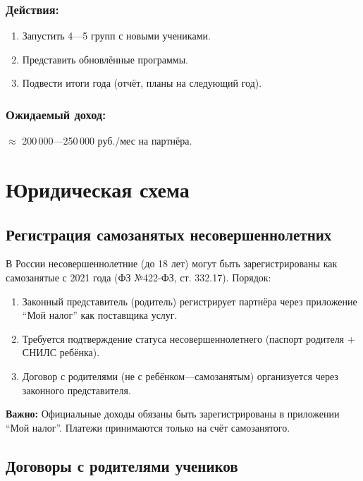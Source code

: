 \documentclass[12pt,a4paper]{article}
\begin{document}
\subsubsection*{Действия:}
\begin{enumerate}
  \item Запустить 4---5 групп с новыми учениками.
  \item Представить обновлённые программы.
  \item Подвести итоги года (отчёт, планы на следующий год).
\end{enumerate}

\subsubsection*{Ожидаемый доход:} ${\approx}$ 200\,000---250\,000 руб./мес на партнёра.

\section{Юридическая схема}

\subsection{Регистрация самозанятых несовершеннолетних}

В России несовершеннолетние (до 18 лет) могут быть зарегистрированы как самозанятые с 2021 года (ФЗ №422-ФЗ, ст. 332.17). Порядок:

\begin{enumerate}
  \item Законный представитель (родитель) регистрирует партнёра через приложение ``Мой налог'' как поставщика услуг.
  \item Требуется подтверждение статуса несовершеннолетнего (паспорт родителя + СНИЛС ребёнка).
  \item Договор с родителями (не с ребёнком---самозанятым) организуется через законного представителя.
\end{enumerate}

\textbf{Важно:} Официальные доходы обязаны быть зарегистрированы в приложении ``Мой налог''. Платежи принимаются только на счёт самозанятого.

\subsection{Договоры с родителями учеников}
\end{document}
